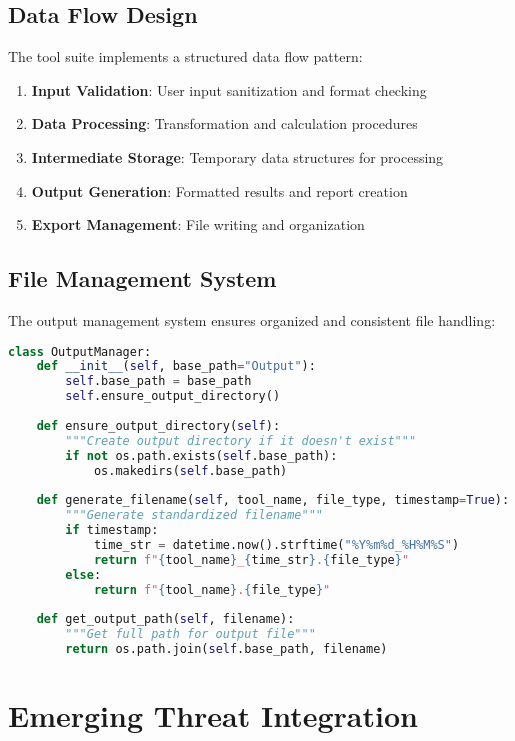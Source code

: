 \documentclass[binding=0.6cm]{sapthesis}
\begin{document}
\subsection{Data Flow Design}

The tool suite implements a structured data flow pattern:

\begin{enumerate}
    \item \textbf{Input Validation}: User input sanitization and format checking
    \item \textbf{Data Processing}: Transformation and calculation procedures
    \item \textbf{Intermediate Storage}: Temporary data structures for processing
    \item \textbf{Output Generation}: Formatted results and report creation
    \item \textbf{Export Management}: File writing and organization
\end{enumerate}

\subsection{File Management System}

The output management system ensures organized and consistent file handling:

\begin{lstlisting}[language=Python, caption=Output Management Implementation]
class OutputManager:
    def __init__(self, base_path="Output"):
        self.base_path = base_path
        self.ensure_output_directory()
    
    def ensure_output_directory(self):
        """Create output directory if it doesn't exist"""
        if not os.path.exists(self.base_path):
            os.makedirs(self.base_path)
    
    def generate_filename(self, tool_name, file_type, timestamp=True):
        """Generate standardized filename"""
        if timestamp:
            time_str = datetime.now().strftime("%Y%m%d_%H%M%S")
            return f"{tool_name}_{time_str}.{file_type}"
        else:
            return f"{tool_name}.{file_type}"
    
    def get_output_path(self, filename):
        """Get full path for output file"""
        return os.path.join(self.base_path, filename)
\end{lstlisting}

\section{Emerging Threat Integration}
\end{document}
